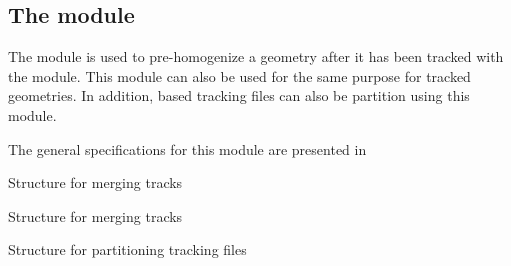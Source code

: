 \subsection{The  module}\label{sect:MRGData}


The  module is used to pre-homogenize a geometry after it has been tracked with the  module. This module can also be used for
the same purpose for  tracked geometries.\cite{MRG1,MRG2,Harrisson2011a} In addition,  based tracking files can
also be partition using this module. 

The general specifications for this module are presented in 

\begin{DataStructure}{Structure for merging  tracks}\label{tab:MRGDataexcelt}
 
\moc{:=}      \moc{::}   
\end{DataStructure}

\begin{DataStructure}{Structure for merging  tracks}\label{tab:MRGDatanxttrk}
 \moc{:=}     \moc{::}   
\end{DataStructure}

\begin{DataStructure}{Structure for partitioning  tracking files}\label{tab:PARTDatanxtfil}
  \moc{:=}      \moc{::}   
\end{DataStructure}

